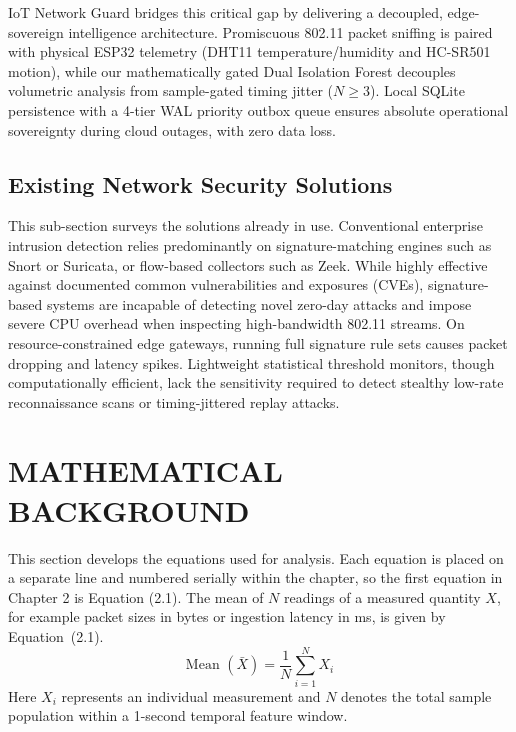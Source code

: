 \documentclass[11pt,a4paper]{report}
\begin{document}
IoT Network Guard bridges this critical gap by delivering a decoupled, edge-sovereign intelligence architecture. Promiscuous 802.11 packet sniffing is paired with physical ESP32 telemetry (DHT11 temperature/humidity and HC-SR501 motion), while our mathematically gated Dual Isolation Forest decouples volumetric analysis from sample-gated timing jitter ($N \ge 3$). Local SQLite persistence with a 4-tier WAL priority outbox queue ensures absolute operational sovereignty during cloud outages, with zero data loss.

\subsection{Existing Network Security Solutions}
This sub-section surveys the solutions already in use. Conventional enterprise intrusion detection relies predominantly on signature-matching engines such as Snort or Suricata, or flow-based collectors such as Zeek. While highly effective against documented common vulnerabilities and exposures (CVEs), signature-based systems are incapable of detecting novel zero-day attacks and impose severe CPU overhead when inspecting high-bandwidth 802.11 streams. On resource-constrained edge gateways, running full signature rule sets causes packet dropping and latency spikes. Lightweight statistical threshold monitors, though computationally efficient, lack the sensitivity required to detect stealthy low-rate reconnaissance scans or timing-jittered replay attacks.

\section{MATHEMATICAL BACKGROUND}
This section develops the equations used for analysis. Each equation is placed on a separate line and numbered serially within the chapter, so the first equation in Chapter 2 is Equation (2.1). The mean of $N$ readings of a measured quantity $X$, for example packet sizes in bytes or ingestion latency in ms, is given by Equation~(2.1).
\begin{equation}
\text{Mean } (\bar{X}) = \frac{1}{N} \sum_{i=1}^{N} X_i \label{eq:mean}
\end{equation}
Here $X_i$ represents an individual measurement and $N$ denotes the total sample population within a 1-second temporal feature window. 
\end{document}
